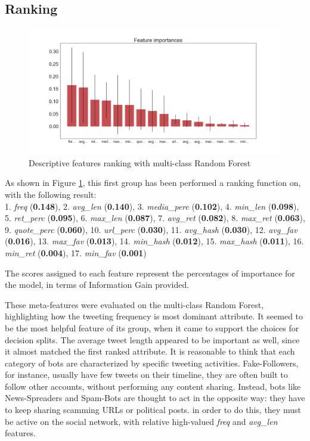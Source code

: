 \subsection{Ranking}
\begin{figure}[htp!]
	\centering
	\includegraphics[width=\columnwidth]{chapter4/figure/desc_features_importances.png}
	\caption{Descriptive features ranking with multi-class Random Forest}
	\label{fig:desc_rank}
\end{figure}
As shown in Figure \ref{fig:desc_rank}, this first group has been performed a ranking function on, with the following result:\\
1. \textit{freq} (\textbf{0.148}), 2. \textit{avg\_len} (\textbf{0.140}), 3. \textit{media\_perc} (\textbf{0.102}), 4. \textit{min\_len} (\textbf{0.098}), 5. \textit{ret\_perc} (\textbf{0.095}), 6. \textit{max\_len} (\textbf{0.087}), 7. \textit{avg\_ret} (\textbf{0.082}), 8. \textit{max\_ret} (\textbf{0.063}), 9. \textit{quote\_perc} (\textbf{0.060}), 10. \textit{url\_perc} (\textbf{0.030}), 11. \textit{avg\_hash} (\textbf{0.030}), 12. \textit{avg\_fav} (\textbf{0.016}), 13. \textit{max\_fav} (\textbf{0.013}), 14. \textit{min\_hash} (\textbf{0.012}), 15. \textit{max\_hash} (\textbf{0.011}), 16. \textit{min\_ret} (\textbf{0.004}), 17. \textit{min\_fav} (\textbf{0.001})

The scores assigned to each feature represent the percentages of importance for the model, in terms of Information Gain provided.

These meta-features were evaluated on the multi-class Random Forest, highlighting how the tweeting frequency is most dominant attribute. It seemed to be the most helpful feature of its group, when it came to support the choices for decision splits.
The average tweet length appeared to be important as well, since it almost matched the first ranked attribute. It is reasonable to think that each category of bots are characterized by specific tweeting activities. Fake-Followers, for instance, usually have few tweets on their timeline, they are often built to follow other accounts, without performing any content sharing. Instead, bots like News-Spreaders and Spam-Bots are thought to act in the opposite way: they have to keep sharing scamming URLs or political posts. in order to do this, they must be active on the social network, with relative high-valued \textit{freq} and \textit{avg\_len} features.

